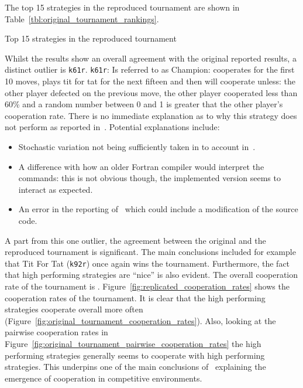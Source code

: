 \documentclass{article}
\begin{document}
The top 15 strategies in the reproduced tournament are shown in
Table~\ref{tbl:original_tournament_rankings}.

\begin{table}[!hbtp]
        \centering
        
        \caption{Top 15 strategies in the reproduced tournament}
        \label{tbl:original_tournament_rankings}
\end{table}

Whilst the results show an overall agreement with the original reported results,
a distinct outlier is \texttt{k61r}.
\texttt{k61r}: Is referred to as Champion: cooperates for the first 10
moves, plays tit for tat for the next fifteen and then will cooperate
unless: the other player defected on the previous move, the
other player cooperated less than 60\% and a random number between
0 and 1 is greater that the other player's cooperation rate. There is no
immediate explanation as to why this strategy does not perform as reported
in~\cite{Axelrod1980b}. Potential explanations include:

\begin{itemize}
    \item Stochastic variation not being sufficiently taken in to account
        in~\cite{Axelrod1980b}.
    \item A difference with how an older Fortran compiler would interpret the
        commands: this is not obvious though, the implemented version seems to
        interact as expected.
    \item An error in the reporting of~\cite{Axelrod1980b} which could include
        a modification of the source code.
\end{itemize}

A part from this one outlier, the agreement between the original and the
reproduced tournament is significant. The main conclusions included for example
that Tit For Tat (\texttt{k92r}) once again wins the tournament. Furthermore,
the fact that high performing strategies are ``nice'' is also evident.
The overall cooperation rate of the tournament
is .
Figure~\ref{fig:replicated_cooperation_rates} shows the
cooperation rates of the tournament. It is clear that the high performing
strategies cooperate overall more often
(Figure~\ref{fig:original_tournament_cooperation_rates}). Also, looking at the
pairwise cooperation rates in
Figure~\ref{fig:original_tournament_pairwise_cooperation_rates} the high
performing strategies generally seems to cooperate with high performing
strategies. This underpins one of the main conclusions of~\cite{Axelrod1980b}
explaining the emergence of cooperation in competitive environments.
\end{document}
